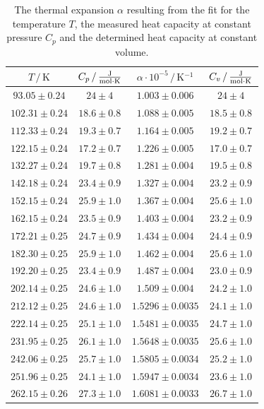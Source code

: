 \begin{table}
    \centering
    \caption{The thermal expansion $\alpha$ resulting from the fit for the temperature $T$, the measured heat capacity at constant pressure $C_p$ and the determined heat capacity at constant volume.}
    \label{tab:C_v}
    \begin{tabular}{c c c c}
        \toprule
        $T \,/\, \unit{\kelvin}$ & $C_p \,/\, \unit{\frac{\joule}{\mol \cdot \kelvin}}$ & $\alpha \cdot 10^{-5} \,/\, \unit{\kelvin^{-1}}$ & $C_v \,/\, \unit{\frac{\joule}{\mol \cdot \kelvin}}$\\
        \midrule
        $93.05\pm0.24$ & $24\pm4$ & $1.003\pm0.006$ & $24\pm4$ \\
        $102.31\pm0.24$ & $18.6\pm0.8$ & $1.088\pm0.005$ & $18.5\pm0.8$ \\
        $112.33\pm0.24$ & $19.3\pm0.7$ & $1.164\pm0.005$ & $19.2\pm0.7$ \\
        $122.15\pm0.24$ & $17.2\pm0.7$ & $1.226\pm0.005$ & $17.0\pm0.7$ \\
        $132.27\pm0.24$ & $19.7\pm0.8$ & $1.281\pm0.004$ & $19.5\pm0.8$ \\
        $142.18\pm0.24$ & $23.4\pm0.9$ & $1.327\pm0.004$ & $23.2\pm0.9$ \\
        $152.15\pm0.24$ & $25.9\pm1.0$ & $1.367\pm0.004$ & $25.6\pm1.0$ \\
        $162.15\pm0.24$ & $23.5\pm0.9$ & $1.403\pm0.004$ & $23.2\pm0.9$ \\
        $172.21\pm0.25$ & $24.7\pm0.9$ & $1.434\pm0.004$ & $24.4\pm0.9$ \\
        $182.30\pm0.25$ & $25.9\pm1.0$ & $1.462\pm0.004$ & $25.6\pm1.0$ \\
        $192.20\pm0.25$ & $23.4\pm0.9$ & $1.487\pm0.004$ & $23.0\pm0.9$ \\
        $202.14\pm0.25$ & $24.6\pm1.0$ & $1.509\pm0.004$ & $24.2\pm1.0$ \\
        $212.12\pm0.25$ & $24.6\pm1.0$ & $1.5296\pm0.0035$ & $24.1\pm1.0$ \\
        $222.14\pm0.25$ & $25.1\pm1.0$ & $1.5481\pm0.0035$ & $24.7\pm1.0$ \\
        $231.95\pm0.25$ & $26.1\pm1.0$ & $1.5648\pm0.0035$ & $25.6\pm1.0$ \\
        $242.06\pm0.25$ & $25.7\pm1.0$ & $1.5805\pm0.0034$ & $25.2\pm1.0$ \\
        $251.96\pm0.25$ & $24.1\pm1.0$ & $1.5947\pm0.0034$ & $23.6\pm1.0$ \\
        $262.15\pm0.26$ & $27.3\pm1.0$ & $1.6081\pm0.0033$ & $26.7\pm1.0$ \\

\end{tabular}
\end{table}
